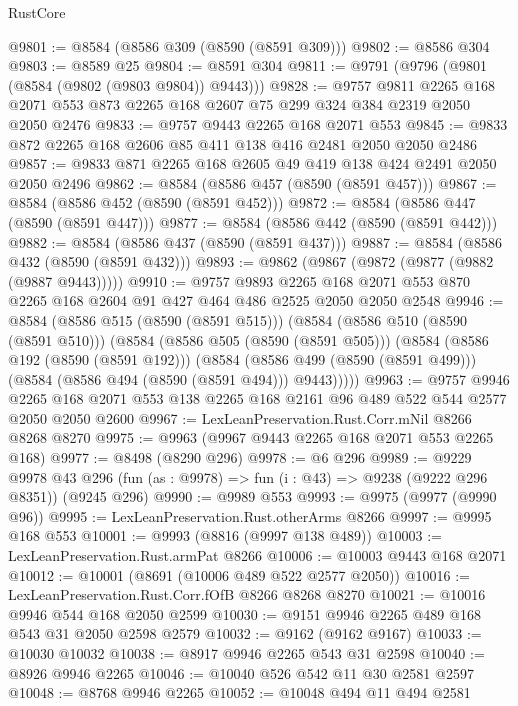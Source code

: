 \begin{lexlean}{RustCore}
\begin{coremodule}
@9801 := @8584 (@8586 @309 (@8590 (@8591 @309)))
@9802 := @8586 @304
@9803 := @8589 @25
@9804 := @8591 @304
@9811 := @9791 (@9796 (@9801 (@8584 (@9802 (@9803 @9804)) @9443)))
@9828 := @9757
    @9811
    @2265
    @168
    @2071
    @553
    @873
    @2265
    @168
    @2607
    @75
    @299
    @324
    @384
    @2319
    @2050
    @2050
    @2476
@9833 := @9757 @9443 @2265 @168 @2071 @553
@9845 := @9833 @872 @2265 @168 @2606 @85 @411 @138 @416 @2481 @2050 @2050 @2486
@9857 := @9833 @871 @2265 @168 @2605 @49 @419 @138 @424 @2491 @2050 @2050 @2496
@9862 := @8584 (@8586 @457 (@8590 (@8591 @457)))
@9867 := @8584 (@8586 @452 (@8590 (@8591 @452)))
@9872 := @8584 (@8586 @447 (@8590 (@8591 @447)))
@9877 := @8584 (@8586 @442 (@8590 (@8591 @442)))
@9882 := @8584 (@8586 @437 (@8590 (@8591 @437)))
@9887 := @8584 (@8586 @432 (@8590 (@8591 @432)))
@9893 := @9862 (@9867 (@9872 (@9877 (@9882 (@9887 @9443)))))
@9910 := @9757
    @9893
    @2265
    @168
    @2071
    @553
    @870
    @2265
    @168
    @2604
    @91
    @427
    @464
    @486
    @2525
    @2050
    @2050
    @2548
@9946 := @8584
    (@8586 @515 (@8590 (@8591 @515)))
    (@8584
      (@8586 @510 (@8590 (@8591 @510)))
      (@8584
        (@8586 @505 (@8590 (@8591 @505)))
        (@8584
          (@8586 @192 (@8590 (@8591 @192)))
          (@8584
            (@8586 @499 (@8590 (@8591 @499)))
            (@8584 (@8586 @494 (@8590 (@8591 @494))) @9443)))))
@9963 := @9757
    @9946
    @2265
    @168
    @2071
    @553
    @138
    @2265
    @168
    @2161
    @96
    @489
    @522
    @544
    @2577
    @2050
    @2050
    @2600
@9967 := LexLeanPreservation.Rust.Corr.mNil @8266 @8268 @8270
@9975 := @9963 (@9967 @9443 @2265 @168 @2071 @553 @2265 @168)
@9977 := @8498 (@8290 @296)
@9978 := @6 @296
@9989 := @9229
    @9978
    @43
    @296
    (fun (as : @9978) => fun (i : @43) => @9238 (@9222 @296 @8351))
    (@9245 @296)
@9990 := @9989 @553
@9993 := @9975 (@9977 (@9990 @96))
@9995 := LexLeanPreservation.Rust.otherArms @8266
@9997 := @9995 @168 @553
@10001 := @9993 (@8816 (@9997 @138 @489))
@10003 := LexLeanPreservation.Rust.armPat @8266
@10006 := @10003 @9443 @168 @2071
@10012 := @10001 (@8691 (@10006 @489 @522 @2577 @2050))
@10016 := LexLeanPreservation.Rust.Corr.fOfB @8266 @8268 @8270
@10021 := @10016 @9946 @544 @168 @2050 @2599
@10030 := @9151 @9946 @2265 @489 @168 @543 @31 @2050 @2598 @2579
@10032 := @9162 (@9162 @9167)
@10033 := @10030 @10032
@10038 := @8917 @9946 @2265 @543 @31 @2598
@10040 := @8926 @9946 @2265
@10046 := @10040 @526 @542 @11 @30 @2581 @2597
@10048 := @8768 @9946 @2265
@10052 := @10048 @494 @11 @494 @2581

\end{coremodule}
\end{lexlean}
